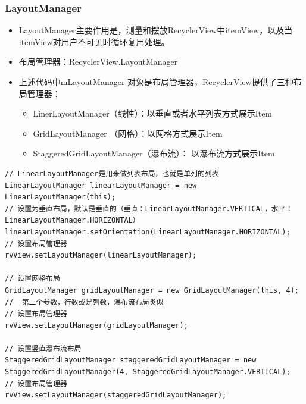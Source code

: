 \documentclass[9pt, b5paper]{article}
\begin{document}
\subsubsection{LayoutManager}
\label{sec-5-3-3}
\begin{itemize}
\item LayoutManager主要作用是，测量和摆放RecyclerView中itemView，以及当itemView对用户不可见时循环复用处理。
\item 布局管理器：RecyclerView.LayoutManager
\item 上述代码中mLayoutManager 对象是布局管理器，RecyclerView提供了三种布局管理器：
\begin{itemize}
\item LinerLayoutManager（线性）：以垂直或者水平列表方式展示Item
\item GridLayoutManager （网格）：以网格方式展示Item
\item StaggeredGridLayoutManager（瀑布流）： 以瀑布流方式展示Item
\end{itemize}
\end{itemize}
\begin{verbatim}
// LinearLayoutManager是用来做列表布局，也就是单列的列表
LinearLayoutManager linearLayoutManager = new LinearLayoutManager(this);
// 设置为垂直布局，默认是垂直的（垂直：LinearLayoutManager.VERTICAL，水平：LinearLayoutManager.HORIZONTAL）
linearLayoutManager.setOrientation(LinearLayoutManager.HORIZONTAL);
// 设置布局管理器
rvView.setLayoutManager(linearLayoutManager);

// 设置网格布局
GridLayoutManager gridLayoutManager = new GridLayoutManager(this, 4); //  第二个参数，行数或是列数，瀑布流布局类似
// 设置布局管理器
rvView.setLayoutManager(gridLayoutManager);

// 设置竖直瀑布流布局
StaggeredGridLayoutManager staggeredGridLayoutManager = new StaggeredGridLayoutManager(4, StaggeredGridLayoutManager.VERTICAL);
// 设置布局管理器
rvView.setLayoutManager(staggeredGridLayoutManager);
\end{verbatim}
\end{document}
